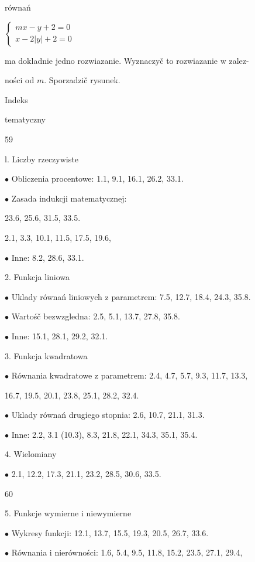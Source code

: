 \documentclass[a4paper,12pt]{article}
\begin{document}
równań

$\left\{\begin{array}{l}
mx-y+2=0\\
x-2|y|+2=0
\end{array}\right.$

ma dokladnie jedno rozwiazanie. Wyznaczyč to rozwiazanie $\mathrm{w}$ zalez-

ności od $m$. Sporzadzič rysunek.





Indeks

tematyczny





59

l. Liczby rzeczywiste

$\bullet$ Obliczenia procentowe: 1.1, 9.1, 16.1, 26.2, 33.1.

$\bullet$ Zasada indukcji matematycznej:

23.6, 25.6, 31.5, 33.5.

2.1, 3.3, 10.1, 11.5, 17.5, 19.6,

$\bullet$ Inne: 8.2, 28.6, 33.1.

2. Funkcja liniowa

$\bullet$ Uklady równań liniowych $\mathrm{z}$ parametrem: 7.5, 12.7, 18.4, 24.3, 35.8.

$\bullet$ Wartośč bezwzgledna: 2.5, 5.1, 13.7, 27.8, 35.8.

$\bullet$ Inne: 15.1, 28.1, 29.2, 32.1.

3. Funkcja kwadratowa

$\bullet$ Równania kwadratowe $\mathrm{z}$ parametrem: 2.4, 4.7, 5.7, 9.3, 11.7, 13.3,

16.7, 19.5, 20.1, 23.8, 25.1, 28.2, 32.4.

$\bullet$ Uklady równań drugiego stopnia: 2.6, 10.7, 21.1, 31.3.

$\bullet$ Inne: 2.2, 3.1 (10.3), 8.3, 21.8, 22.1, 34.3, 35.1, 35.4.

4. Wielomiany

$\bullet$ 2.1, 12.2, 17.3, 21.1, 23.2, 28.5, 30.6, 33.5.





60

5. Funkcje wymierne i niewymierne

$\bullet$ Wykresy funkcji: 12.1, 13.7, 15.5, 19.3, 20.5, 26.7, 33.6.

$\bullet$ Równania $\mathrm{i}$ nierówności: 1.6, 5.4, 9.5, 11.8, 15.2, 23.5, 27.1, 29.4,
\end{document}
